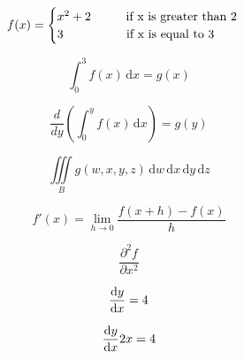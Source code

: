 \documentclass{article}
\begin{document}
\[f(x)=
\begin{cases}
    x^2+2 \hspace{1cm} \text{if x is greater than 2}\\
    3 \hspace{1.8cm} \text{if x is equal to 3}
\end{cases}
\]

\begin{equation}
    \int_{0}^3 f(x) \,\mathrm{d}x=g(x)
\end{equation}

\begin{equation}
    \frac{d}{dy}\left(\int_{0}^y f(x) \,\mathrm{d}x\right)=g(y)
\end{equation}

\begin{equation}
    \iiint\limits_B g(w,x,y,z) \,\mathrm{d}w\,\mathrm{d}x\,\mathrm{d}y\,\mathrm{d}z
\end{equation}

\begin{equation}
    f'(x)=\lim_{h \to 0} \frac{f(x+h)-f(x)}{h}
\end{equation}

\begin{equation}
    \frac{\partial^2 f}{\partial x^2}
\end{equation}

\begin{equation}
    \diff[1]yx=4
\end{equation}

\[
\diff{y}{x} 2x=4
\]
\end{document}
